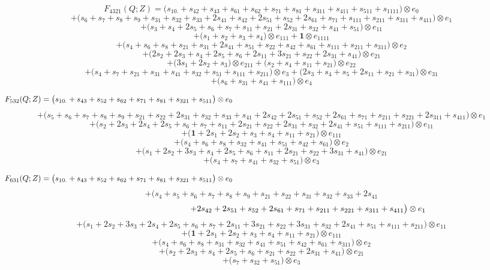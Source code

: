 \documentclass[12pt]{amsart}
\theoremstyle{plain}
\theoremstyle{definition}
\theoremstyle{remark}
\begin{document}
\vfill\eject
$$F_{ 4321 }(Q;Z)=
\big( s_{10.} + s_{42} + s_{43} + s_{61} + s_{62} + s_{71} + s_{81} + s_{311} + s_{411} + s_{511} + s_{1111} \big) \otimes e_{ 0 } $$ $$
+\big( s_{6} + s_{7} + s_{8} + s_{9} + s_{31} + s_{32} + s_{33} + 2 s_{41} + s_{42} + 2 s_{51} + s_{52} + 2 s_{61} + s_{71} + s_{111} + s_{211} + s_{311} + s_{411} \big) \otimes e_{ 1 } $$ $$
+\big( s_{3} + s_{4} + 2 s_{5} + s_{6} + s_{7} + s_{11} + s_{21} + 2 s_{31} + s_{32} + s_{41} + s_{51} \big) \otimes e_{ 11 } $$ $$
+\big( s_{1} + s_{2} + s_{3} + s_{4} \big) \otimes e_{ 111 }
+ \boldsymbol{1} \otimes e_{ 1111 } $$ $$
+\big( s_{4} + s_{6} + s_{8} + s_{21} + s_{31} + 2 s_{41} + s_{51} + s_{22} + s_{42} + s_{61} + s_{111} + s_{211} + s_{311} \big) \otimes e_{ 2 } $$ $$
+\big( 2 s_{2} + 2 s_{3} + s_{4} + 2 s_{5} + s_{6} + 2 s_{11} + 3 s_{21} + s_{22} + 2 s_{31} + s_{41} \big) \otimes e_{ 21 } $$ $$
+\big( 3 s_{1} + 2 s_{2} + s_{3} \big) \otimes e_{ 211 }
+\big( s_{2} + s_{4} + s_{11} + s_{21} \big) \otimes e_{ 22 } $$ $$
+\big( s_{4} + s_{7} + s_{21} + s_{31} + s_{41} + s_{32} + s_{51} + s_{111} + s_{211} \big) \otimes e_{ 3 }
+\big( 2 s_{3} + s_{4} + s_{5} + 2 s_{11} + s_{21} + s_{31} \big) \otimes e_{ 31 } $$ $$
+\big( s_{6} + s_{31} + s_{41} + s_{111} \big) \otimes e_{ 4 }
$$

$$F_{ 532 }(Q;Z)=
\big( s_{10.} + s_{43} + s_{52} + s_{62} + s_{71} + s_{81} + s_{321} + s_{511} \big) \otimes e_{ 0 } \hskip 5in \  $$ $$
+\big( s_{5} + s_{6} + s_{7} + s_{8} + s_{9} + s_{21} + s_{22} + 2 s_{31} + s_{32} + s_{33} + s_{41} + 2 s_{42} + 2 s_{51} + s_{52} + 2 s_{61} + s_{71} + s_{211} + s_{221} + 2 s_{311} + s_{411} \big) \otimes e_{ 1 } $$ $$
+\big( s_{2} + 2 s_{3} + 2 s_{4} + 2 s_{5} + s_{6} + s_{7} + s_{11} + 2 s_{21} + s_{22} + 2 s_{31} + s_{32} + 2 s_{41} + s_{51} + s_{111} + s_{211} \big) \otimes e_{ 11 } $$ $$
+\big( \boldsymbol{1} + 2 s_{1} + 2 s_{2} + s_{3} + s_{4} + s_{11} + s_{21} \big) \otimes e_{ 111 } $$ $$
+\big( s_{4} + s_{6} + s_{8} + s_{32} + s_{41} + s_{51} + s_{42} + s_{61} \big) \otimes e_{ 2 } $$ $$
+\big( s_{1} + 2 s_{2} + 3 s_{3} + s_{4} + 2 s_{5} + s_{6} + s_{11} + 2 s_{21} + s_{22} + 3 s_{31} + s_{41} \big) \otimes e_{ 21 } $$ $$
+\big( s_{4} + s_{7} + s_{41} + s_{32} + s_{51} \big) \otimes e_{ 3 }
$$

$$F_{ 631 }(Q;Z)=
\big( s_{10.} + s_{43} + s_{52} + s_{62} + s_{71} + s_{81} + s_{321} + s_{511} \big) \otimes e_{ 0 }\hskip 5in \  $$ $$
+\big( s_{4} + s_{5} + s_{6} + s_{7} + s_{8} + s_{9} + s_{21} + s_{22} + s_{31} + s_{32} + s_{33} + 2 s_{41}  $$ $$
\ \hskip 1.5in + 2 s_{42} + 2 s_{51} + s_{52} + 2 s_{61} + s_{71} + s_{211} + s_{221} + s_{311} + s_{411} \big) \otimes e_{ 1 } $$ $$
+\big( s_{1} + 2 s_{2} + 3 s_{3} + 2 s_{4} + 2 s_{5} + s_{6} + s_{7} + 2 s_{11} + 3 s_{21} + s_{22} + 3 s_{31} + s_{32} + 2 s_{41} + s_{51} + s_{111} + s_{211} \big) \otimes e_{ 11 } $$ $$
+\big( \boldsymbol{1} + 2 s_{1} + 2 s_{2} + s_{3} + s_{4} + s_{11} + s_{21} \big) \otimes e_{ 111 } $$ $$
+\big( s_{4} + s_{6} + s_{8} + s_{31} + s_{32} + s_{41} + s_{51} + s_{42} + s_{61} + s_{311} \big) \otimes e_{ 2 } $$ $$
+\big( s_{2} + 2 s_{3} + s_{4} + 2 s_{5} + s_{6} + s_{21} + s_{22} + 2 s_{31} + s_{41} \big) \otimes e_{ 21 } $$ $$
+\big( s_{7} + s_{32} + s_{51} \big) \otimes e_{ 3 }
$$
\end{document}
